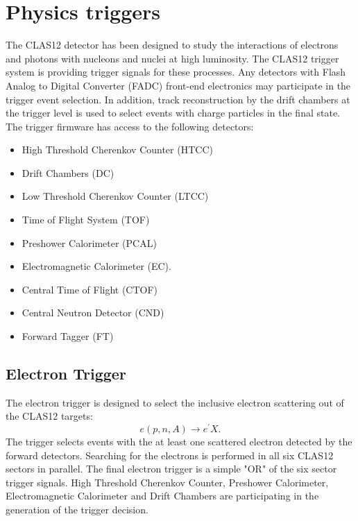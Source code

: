 \section{Physics triggers}





The CLAS12 detector  has been designed to study the interactions of electrons and photons with nucleons and nuclei at high luminosity. 
The CLAS12 trigger system is providing trigger signals for these processes. 
Any detectors with Flash Analog to Digital Converter (FADC) front-end electronics may participate in the trigger event selection.  In addition, track reconstruction by the drift chambers at the trigger level is used to select events with charge particles in the final state. 
The trigger firmware has access to  the following detectors:
\begin{itemize}
\item High Threshold Cherenkov Counter (HTCC)
\item Drift Chambers (DC)
\item Low Threshold Cherenkov Counter (LTCC)
\item Time of Flight System (TOF)
\item Preshower Calorimeter (PCAL)
\item Electromagnetic Calorimeter (EC).
\item Central Time of Flight (CTOF)
\item Central Neutron Detector (CND)
\item Forward Tagger (FT)
\end{itemize}

\subsection{Electron Trigger}
The electron trigger is designed to select the inclusive electron scattering out of the CLAS12 targets:
\begin{equation}
e(p,n,A)\rightarrow e^\prime X.
\label{eqn:electron}
\end{equation}
\noindent
The trigger  selects  events with the at least one scattered  electron detected by the forward detectors.
Searching for the electrons is performed  in all six CLAS12 sectors in parallel. The final electron trigger is  a simple "OR" of the six sector trigger signals.
High Threshold Cherenkov Counter,  Preshower Calorimeter,   Electromagnetic Calorimeter and Drift Chambers are participating in the generation of the trigger decision.

